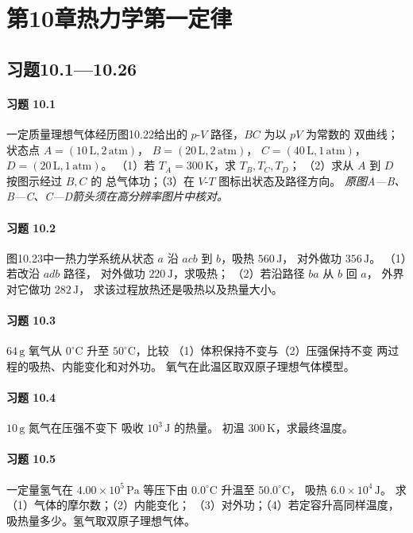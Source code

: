 \section*{第10章\quad 热力学第一定律}
\subsection*{习题10.1—10.26}

\paragraph{习题 10.1}
一定质量理想气体经历图10.22给出的
\(p\)-\(V\) 路径，\(BC\) 为以 \(pV\) 为常数的
双曲线；状态点 \(A=(10\,\mathrm L,2\,\mathrm{atm})\)，
\(B=(20\,\mathrm L,2\,\mathrm{atm})\)，
\(C=(40\,\mathrm L,1\,\mathrm{atm})\)，
\(D=(20\,\mathrm L,1\,\mathrm{atm})\)。
（1）若 \(T_A=300\,\mathrm K\)，求 \(T_B,T_C,T_D\)；
（2）求从 \(A\) 到 \(D\) 按图示经过 \(B,C\) 的
总气体功；（3）在 \(V\)-\(T\) 图标出状态及路径方向。
\textit{原图A—B、B—C、C—D箭头须在高分辨率图片中核对。}

\paragraph{习题 10.2}
图10.23中一热力学系统从状态 \(a\)
沿 \(acb\) 到 \(b\)，吸热 \(560\,\mathrm J\)，
对外做功 \(356\,\mathrm J\)。
（1）若改沿 \(adb\) 路径，
对外做功 \(220\,\mathrm J\)，求吸热；
（2）若沿路径 \(ba\) 从 \(b\) 回 \(a\)，
外界对它做功 \(282\,\mathrm J\)，
求该过程放热还是吸热以及热量大小。

\paragraph{习题 10.3}
\(64\,\mathrm g\) 氧气从 \(0^\circ\mathrm C\)
升至 \(50^\circ\mathrm C\)，比较
（1）体积保持不变与（2）压强保持不变
两过程的吸热、内能变化和对外功。
氧气在此温区取双原子理想气体模型。

\paragraph{习题 10.4}
\(10\,\mathrm g\) 氮气在压强不变下
吸收 \(10^3\,\mathrm J\) 的热量。
初温 \(300\,\mathrm K\)，求最终温度。

\paragraph{习题 10.5}
一定量氢气在
\(4.00\times10^5\,\mathrm{Pa}\)
等压下由 \(0.0^\circ\mathrm C\)
升温至 \(50.0^\circ\mathrm C\)，
吸热 \(6.0\times10^4\,\mathrm J\)。
求（1）气体的摩尔数；（2）内能变化；
（3）对外功；（4）若定容升高同样温度，
吸热量多少。氢气取双原子理想气体。

